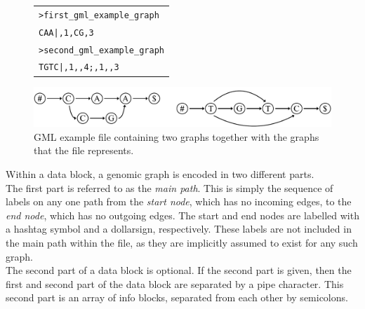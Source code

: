 \documentclass[a4paper,12pt,twoside,BCOR=10mm]{scrbook}
\begin{document}
\begin{figure}[!htb]
\centering
\begin{tabularx}{1.0\textwidth}{ | X | }
\hline
\texttt{>first\_gml\_example\_graph} \\
\texttt{CAA|,1,CG,3} \\
\texttt{>second\_gml\_example\_graph} \\
\texttt{TGTC|,1,,4;,1,,3} \\
\hline
\end{tabularx}
\includegraphics[width=\textwidth]{evo_fig_second_gml_example.pdf}
\caption[GML example file containing two graphs]{GML example file containing two graphs together with the graphs that the file represents.} \label{fig:evo_fig_second_gml_example}
\end{figure}

Within a data block, a genomic graph is encoded in two different parts. \\
The first part is referred to as the \textit{main path}. 
This is simply the sequence of labels on any one path from the \textit{start node}, 
which has no incoming edges, to the \textit{end node}, which has no outgoing edges. 
The start and end nodes are labelled with a hashtag symbol and a dollarsign, respectively. 
These labels are not included in the main path within the file, as they are implicitly assumed 
to exist for any such graph. \\
The second part of a data block is optional. 
If the second part is given, then the first and second part of the data block are separated by a pipe character. 
This second part is an array of info blocks, separated from each other by semicolons.
\end{document}
